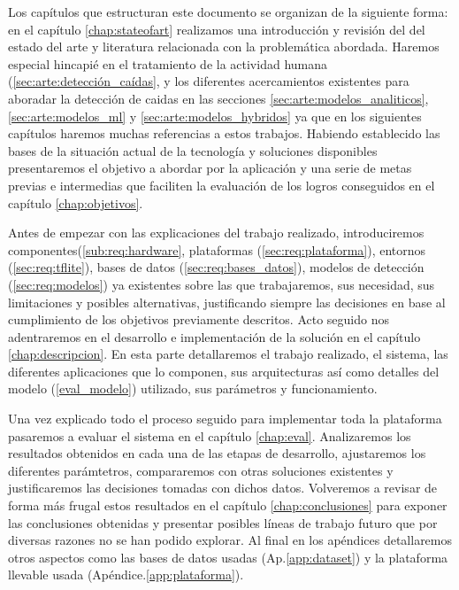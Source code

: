 Los capítulos que estructuran este documento se organizan de la siguiente forma: en el capítulo \ref{chap:stateofart} realizamos una introducción y revisión del del estado del arte y literatura relacionada con la problemática abordada. Haremos especial hincapié en el tratamiento de la actividad humana (\ref{sec:arte:detección_caídas}, y los diferentes acercamientos existentes para aboradar la detección de caidas en las secciones \ref{sec:arte:modelos_analiticos},\ref{sec:arte:modelos_ml} y \ref{sec:arte:modelos_hybridos} ya que en los siguientes capítulos haremos muchas referencias a estos trabajos. Habiendo establecido las bases de la situación actual de la tecnología y soluciones disponibles presentaremos el objetivo a abordar por la aplicación y una serie de metas previas e intermedias que faciliten la evaluación de los logros conseguidos en el capítulo \ref{chap:objetivos}.   

Antes de empezar con las explicaciones del trabajo realizado, introduciremos componentes(\ref{sub:req:hardware}, plataformas (\ref{sec:req:plataforma}), entornos (\ref{sec:req:tflite}), bases de datos (\ref{sec:req:bases_datos}), modelos de detección (\ref{sec:req:modelos}) ya existentes sobre las que trabajaremos, sus necesidad, sus limitaciones y posibles alternativas, justificando siempre las decisiones en base al cumplimiento de los objetivos previamente descritos. Acto seguido nos adentraremos en el desarrollo e implementación de la solución en el capítulo \ref{chap:descripcion}. En esta parte detallaremos el trabajo realizado, el sistema, las diferentes aplicaciones que lo componen, sus arquitecturas así como detalles del modelo (\ref{eval_modelo}) utilizado, sus parámetros y funcionamiento.

Una vez explicado todo el proceso seguido para implementar toda la plataforma pasaremos a evaluar el sistema en el capítulo \ref{chap:eval}. Analizaremos los resultados obtenidos en cada una de las etapas de desarrollo, ajustaremos los diferentes parámtetros, compararemos con otras soluciones existentes y justificaremos las decisiones tomadas con dichos datos. Volveremos a revisar de forma más frugal estos resultados en el capítulo \ref{chap:conclusiones} para exponer las conclusiones obtenidas y presentar posibles líneas de trabajo futuro que por diversas razones no se han podido explorar. Al final en los apéndices detallaremos otros aspectos como las bases de datos usadas (Ap.\ref{app:dataset}) y la plataforma llevable usada (Apéndice.\ref{app:plataforma}).

%
